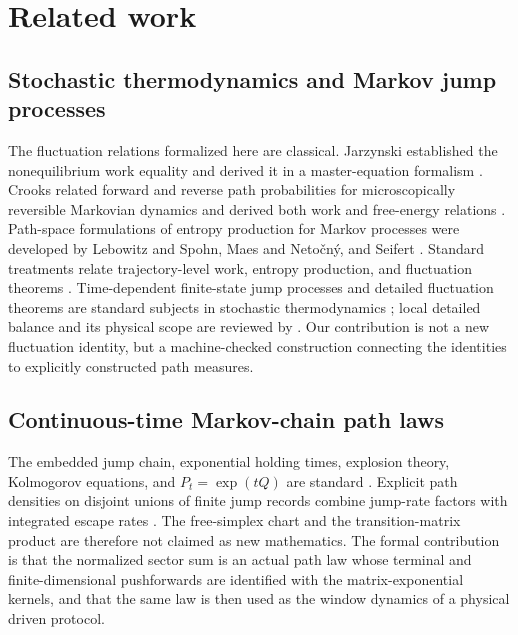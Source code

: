 \section{Related work}
\label{sec:related}

\subsection{Stochastic thermodynamics and Markov jump processes}

The fluctuation relations formalized here are classical. Jarzynski established the nonequilibrium work equality and derived it in a master-equation formalism \parencite{Jarzynski1997PRL,Jarzynski1997PRE}. Crooks related forward and reverse path probabilities for microscopically reversible Markovian dynamics and derived both work and free-energy relations \parencite{Crooks1998,Crooks1999,Crooks2000}. Path-space formulations of entropy production for Markov processes were developed by Lebowitz and Spohn, Maes and Neto\v{c}n\'y, and Seifert \parencite{LebowitzSpohn1999,MaesNetocny2003,Seifert2005,MaesNetocnyWynants2008}. Standard treatments relate trajectory-level work, entropy production, and fluctuation theorems \parencite{Seifert2012,VandenBroeckEsposito2015}. Time-dependent finite-state jump processes and detailed fluctuation theorems are standard subjects in stochastic thermodynamics \parencite{ShargelChou2009,RaoEsposito2018,PelitiPigolotti2021}; local detailed balance and its physical scope are reviewed by \textcite{Maes2021}. Our contribution is not a new fluctuation identity, but a machine-checked construction connecting the identities to explicitly constructed path measures.

\subsection{Continuous-time Markov-chain path laws}

The embedded jump chain, exponential holding times, explosion theory, Kolmogorov equations, and $P_t=\exp(tQ)$ are standard \parencite{Norris1997}. Explicit path densities on disjoint unions of finite jump records combine jump-rate factors with integrated escape rates \parencite{RaoTeh2013}. The free-simplex chart and the transition-matrix product are therefore not claimed as new mathematics. The formal contribution is that the normalized sector sum is an actual path law whose terminal and finite-dimensional pushforwards are identified with the matrix-exponential kernels, and that the same law is then used as the window dynamics of a physical driven protocol.

